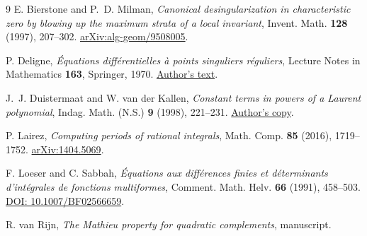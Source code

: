 \documentclass[11pt]{article}
\begin{document}
\begin{thebibliography}{9}
E. Bierstone and P.~D. Milman,
\emph{Canonical desingularization in characteristic zero by blowing up
the maximum strata of a local invariant},
Invent. Math. \textbf{128} (1997), 207--302.
\href{https://arxiv.org/abs/alg-geom/9508005}{arXiv:alg-geom/9508005}.

P. Deligne, \emph{\'Equations diff\'erentielles \`a points singuliers
r\'eguliers}, Lecture Notes in Mathematics \textbf{163},
Springer, 1970.
\href{https://publications.ias.edu/book/export/html/355}{Author's text}.

J.~J. Duistermaat and W. van der Kallen,
\emph{Constant terms in powers of a Laurent polynomial},
Indag. Math. (N.S.) \textbf{9} (1998), 221--231.
\href{https://webspace.science.uu.nl/~kalle101/powers.pdf}{Author's copy}.

P. Lairez, \emph{Computing periods of rational integrals},
Math. Comp. \textbf{85} (2016), 1719--1752.
\href{https://arxiv.org/abs/1404.5069}{arXiv:1404.5069}.

F. Loeser and C. Sabbah,
\emph{\'Equations aux diff\'erences finies et d\'eterminants d'int\'egrales
de fonctions multiformes},
Comment. Math. Helv. \textbf{66} (1991), 458--503.
\href{https://doi.org/10.1007/BF02566659}{DOI: 10.1007/BF02566659}.

R. van Rijn, \emph{The Mathieu property for quadratic complements},
manuscript.
\end{thebibliography}
\end{document}
